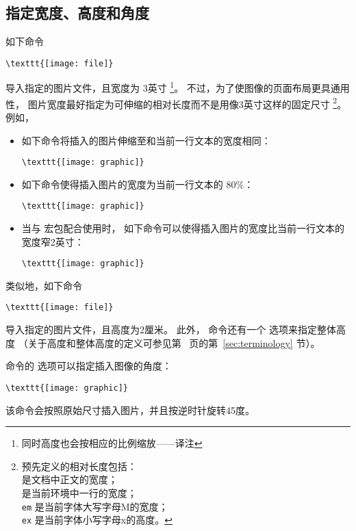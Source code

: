 \subsection{指定宽度、高度和角度}\label{ssec:spec-width-height-angle}
如下命令
\begin{lstlisting}
\texttt{[image: file]}
\end{lstlisting}
导入指定的图片文件，且宽度为 3英寸
\footnote{同时高度也会按相应的比例缩放——译注}。
不过，为了使图像的页面布局更具通用性，
图片宽度最好指定为可伸缩的相对长度而不是用像3英寸这样的固定尺寸
\footnote{
	预先定义的相对长度包括：\\
	 是文档中正文的宽度；\\
	 是当前环境中一行的宽度；\\
	\texttt{em} 是当前字体大写字母M的宽度；\\
	\texttt{ex} 是当前字体小写字母x的高度。}。
例如，
\begin{itemize}
	\item 如下命令将插入的图片伸缩至和当前一行文本的宽度相同：
\begin{lstlisting}
\texttt{[image: graphic]}
\end{lstlisting}
	\item 如下命令使得插入图片的宽度为当前一行文本的 $80\percent$：
\begin{lstlisting}
\texttt{[image: graphic]}
\end{lstlisting}
	\item 当与  宏包配合使用时，
	如下命令可以使得插入图片的宽度比当前一行文本的宽度窄2英寸：
\begin{lstlisting}
\texttt{[image: graphic]}
\end{lstlisting}
	
\end{itemize}

类似地，如下命令
\begin{lstlisting}
\texttt{[image: file]}
\end{lstlisting}
导入指定的图片文件，且高度为2厘米。
此外， 命令还有一个  选项来指定整体高度
（关于高度和整体高度的定义可参见第~\pageref{sec:terminology} 页的第~\ref{sec:terminology} 节）。

 命令的  选项可以指定插入图像的角度：
\begin{lstlisting}
\texttt{[image: graphic]}
\end{lstlisting}
该命令会按照原始尺寸插入图片，并且按逆时针旋转45度。

